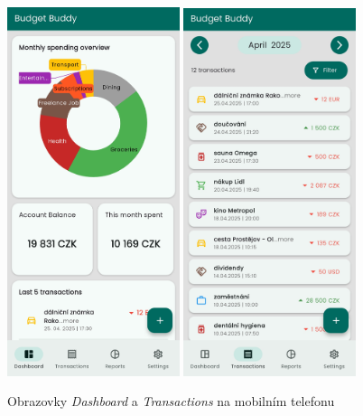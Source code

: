 \documentclass[
  biblatex,
  figures=true,
  tables=false,
  glossaries,
  index
]{kidiplom}
\begin{document}
\begin{figure}
  \centering
  \includegraphics[width=0.45\textwidth]{images/dashboard-mobile.png}
  \hspace{0.5em}
  \includegraphics[width=0.45\textwidth]{images/transactions-mobile.png}
  \caption{Obrazovky \textit{Dashboard} a \textit{Transactions} na mobilním telefonu}
  \label{fig:dashboard-transactions-mobile}
\end{figure}
\end{document}
